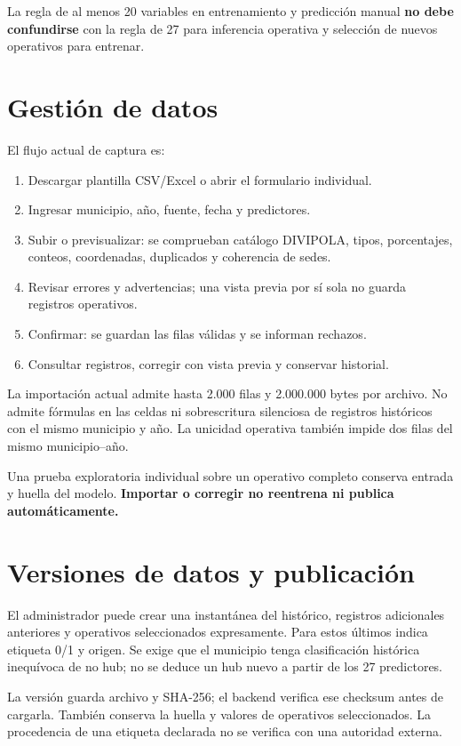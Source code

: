 \documentclass[11pt,a4paper]{report}
\begin{document}
La regla de al menos 20 variables en entrenamiento y predicción manual \textbf{no debe confundirse} con la regla de 27 para inferencia operativa y selección de nuevos operativos para entrenar.

\section{Gestión de datos}
El flujo actual de captura es:
\begin{enumerate}
\item Descargar plantilla CSV/Excel o abrir el formulario individual.
\item Ingresar municipio, año, fuente, fecha y predictores.
\item Subir o previsualizar: se comprueban catálogo DIVIPOLA, tipos, porcentajes, conteos, coordenadas, duplicados y coherencia de sedes.
\item Revisar errores y advertencias; una vista previa por sí sola no guarda registros operativos.
\item Confirmar: se guardan las filas válidas y se informan rechazos.
\item Consultar registros, corregir con vista previa y conservar historial.
\end{enumerate}
La importación actual admite hasta 2.000 filas y 2.000.000 bytes por archivo. No admite fórmulas en las celdas ni sobrescritura silenciosa de registros históricos con el mismo municipio y año. La unicidad operativa también impide dos filas del mismo municipio--año.

Una prueba exploratoria individual sobre un operativo completo conserva entrada y huella del modelo. \textbf{Importar o corregir no reentrena ni publica automáticamente.}

\section{Versiones de datos y publicación}
El administrador puede crear una instantánea del histórico, registros adicionales anteriores y operativos seleccionados expresamente. Para estos últimos indica etiqueta 0/1 y origen. Se exige que el municipio tenga clasificación histórica inequívoca de no hub; no se deduce un hub nuevo a partir de los 27 predictores.

La versión guarda archivo y SHA-256; el backend verifica ese checksum antes de cargarla. También conserva la huella y valores de operativos seleccionados. La procedencia de una etiqueta declarada no se verifica con una autoridad externa.
\end{document}
